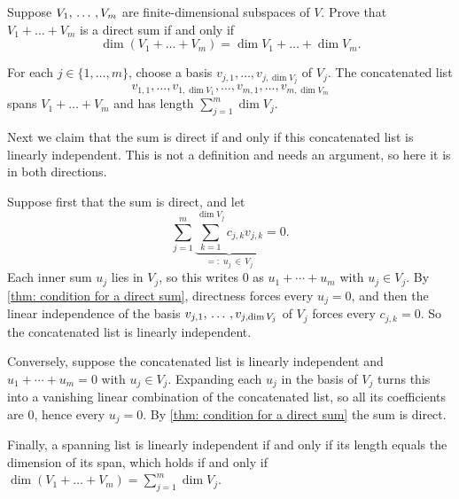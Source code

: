 \begin{xrcs}
  Suppose $V_1, {\, \ldots \,\,}, V_m$ are finite-dimensional subspaces of $V$. Prove that $V_1 + \dots + V_m$ is a direct sum if and only if
  \begin{equation}
    \dim(V_1 + \dots + V_m) = \dim V_1 + \dots + \dim V_m.
  \end{equation}
\begin{xprf}
  For each $j \in \{1, \dots, m\}$, choose a basis $v_{j,1}, \dots, v_{j,\dim V_j}$ of $V_j$.
  The concatenated list
  \[
    v_{1,1}, \dots, v_{1,\dim V_1}, \dots, v_{m,1}, \dots, v_{m,\dim V_m}
  \]
  spans $V_1 + \dots + V_m$ and has length $\sum_{j=1}^m \dim V_j$.

  Next we claim that the sum is direct if and only if this concatenated list is linearly independent. This is not a definition and needs an argument, so here it is in both directions.

  Suppose first that the sum is direct, and let
  \begin{equation}
    \sum_{j=1}^{m} \underbrace{\sum_{k=1}^{\dim V_j} c_{j,k} v_{j,k}}_{=: \; u_j \, \in \, V_j} = 0.
  \end{equation}
  Each inner sum $u_j$ lies in $V_j$, so this writes $0$ as $u_1 + \cdots + u_m$ with $u_j \in V_j$. By \ref{thm: condition for a direct sum}, directness forces every $u_j = 0$, and then the linear independence of the basis $v_{j,1}, {\, \ldots \,\,}, v_{j,\dim V_j}$ of $V_j$ forces every $c_{j,k} = 0$. So the concatenated list is linearly independent.

  Conversely, suppose the concatenated list is linearly independent and $u_1 + \cdots + u_m = 0$ with $u_j \in V_j$. Expanding each $u_j$ in the basis of $V_j$ turns this into a vanishing linear combination of the concatenated list, so all its coefficients are $0$, hence every $u_j = 0$. By \ref{thm: condition for a direct sum} the sum is direct.

  Finally, a spanning list is linearly independent if and only if its length equals the dimension of its span, which holds if and only if
  $\dim(V_1 + \dots + V_m) = \sum_{j=1}^m \dim V_j$.
\end{xprf}
\end{xrcs}